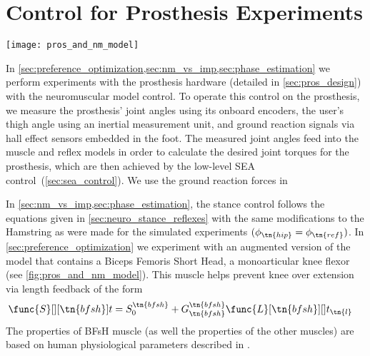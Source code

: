 \section{Control for Prosthesis Experiments}\label{sec:nm_control_prosthesis}

\begin{figure*}[htb]
    \centering
    \texttt{[image: pros\_and\_nm\_model]}
    \caption{(a) Custom transfemoral prosthesis with series elastic actuators. In
    experiments in this thesis, we use an adaptor to test the prosthesis with
    able-bodied subjects. (b) During stance, we propose a control based on a
    neuromuscular model of human physiology that generates joint torques through
    virtual muscles that are stimulated by hypothesized local reflex
    pathways.}\label{fig:pros_and_nm_model}
\end{figure*}

In \cref{sec:preference_optimization,sec:nm_vs_imp,sec:phase_estimation} we
perform experiments with the prosthesis hardware (detailed in
\cref{sec:pros_design}) with the neuromuscular model control. To operate this
control on the prosthesis, we measure the prosthesis' joint angles using its
onboard encoders, the user's thigh angle using an inertial measurement unit, and
ground reaction signals via hall effect sensors embedded in the foot. The
measured joint angles feed into the muscle and reflex models in order to
calculate the desired joint torques for the prosthesis, which are then achieved
by the low-level SEA control~(\cref{sec:sea_control}). We use the ground
reaction forces in 

In \cref{sec:nm_vs_imp,sec:phase_estimation}, the stance control follows the
equations given in \cref{sec:neuro_stance_reflexes} with the same modifications
to the Hamstring as were made for the simulated experiments $(\phi_\tn{hip} =
\phi_\tn{ref})$. In \cref{sec:preference_optimization} we experiment with an
augmented version of the model that contains a Biceps Femoris Short Head, a
monoarticular knee flexor (see \cref{fig:pros_and_nm_model}). This muscle helps
prevent knee over extension via length feedback of the form
\begin{align}
    \func{S}[][\tn{bfsh}]{t} &= S_0^\tn{bfsh} + G_\tn{bfsh}^\tn{bfsh}
        \func{L}[\tn{bfsh}][]{t_\tn{l}}\label{eq:bfsh_stim}
\end{align}
The properties of BFsH muscle (as well the properties of the other muscles) are
based on human physiological parameters described in \citet{song2015neural}.

